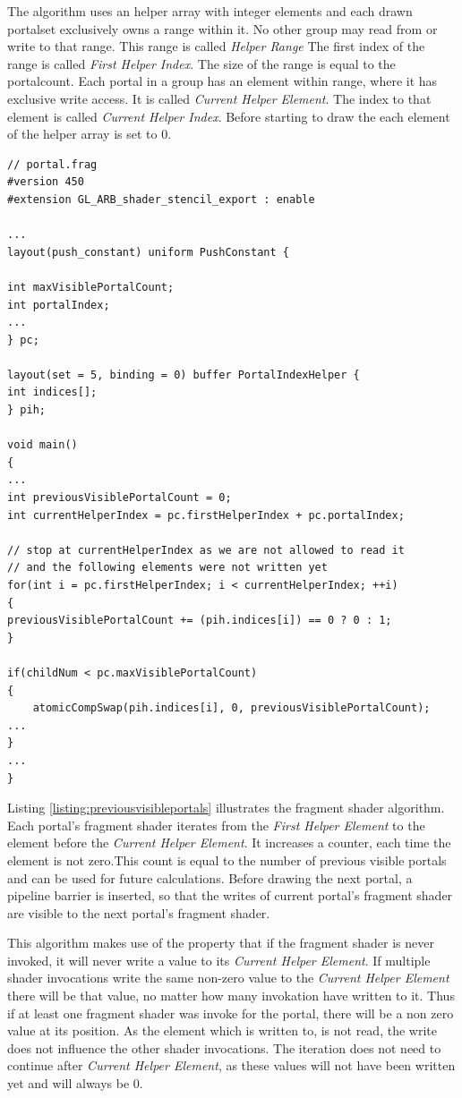 The algorithm uses an helper array with integer elements and each drawn \gls{portalset} exclusively owns a range within it. No other group may read from or write to that range. This range is called \textit{Helper Range} The first index of the range is called \textit{First Helper Index}. The size of the range is equal to the \gls{portalcount}. Each portal in a group has an element within range, where it has exclusive write access. It is called \textit{Current Helper Element}. The index to that element is called \textit{Current Helper Index}. Before starting to draw the each element of the helper array is set to 0.

\begin{lstlisting}[caption={Calculate Previous Visible Portals}, label=listing:previousvisibleportals]
// portal.frag
#version 450
#extension GL_ARB_shader_stencil_export : enable

...
layout(push_constant) uniform PushConstant {	

int maxVisiblePortalCount;
int portalIndex;
...
} pc;

layout(set = 5, binding = 0) buffer PortalIndexHelper {
int indices[];
} pih;

void main()
{
...
int previousVisiblePortalCount = 0;
int currentHelperIndex = pc.firstHelperIndex + pc.portalIndex;

// stop at currentHelperIndex as we are not allowed to read it
// and the following elements were not written yet
for(int i = pc.firstHelperIndex; i < currentHelperIndex; ++i)
{
previousVisiblePortalCount += (pih.indices[i]) == 0 ? 0 : 1;
}

if(childNum < pc.maxVisiblePortalCount)
{
	atomicCompSwap(pih.indices[i], 0, previousVisiblePortalCount);
...
}
...
}
\end{lstlisting}

Listing \ref{listing:previousvisibleportals} illustrates the fragment shader algorithm. Each portal's fragment shader iterates from the \textit{First Helper Element} to the element before the \textit{Current Helper Element}. It increases a counter, each time the element is not zero.This count is equal to the number of previous visible portals and can be used for future calculations. Before drawing the next portal, a pipeline barrier is inserted, so that the writes of current portal's fragment shader are visible to the next portal's fragment shader.

This algorithm makes use of the property that if the fragment shader is never invoked, it will never write a value to its \textit{Current Helper Element}. If multiple shader invocations write the same non-zero value to the \textit{Current Helper Element} there will be that value, no matter how many invokation have written to it.
Thus if at least one fragment shader was invoke for the portal, there will be a non zero value at its position. As the element which is written to, is not read, the write does not influence the other shader invocations. The iteration does not need to continue after \textit{Current Helper Element}, as these values will not have been written yet and will always be 0.

